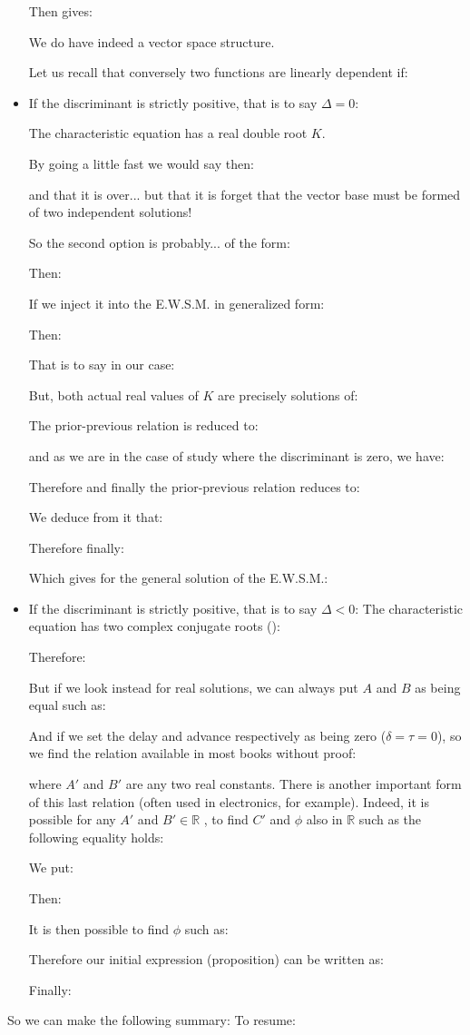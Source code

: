 \begin{itemize}
		Then gives:
		
		We do have indeed a vector space structure.
		
		Let us recall that conversely two functions are linearly dependent if:
		
		\item If the discriminant is strictly positive, that is to say $\Delta=0$: 
		
		The characteristic equation has a real double root $K$.
		
		By going a little fast we would say then:
		
		and that it is over... but that it is forget that the vector base must be formed of two independent solutions!
		
		So the second option is probably... of the form:
		
		Then:
		
		If we inject it into the E.W.S.M. in generalized form:
		
		Then:
		
		That is to say in our case:
		
		But, both actual real values of $K$ are precisely solutions of:
		
		The prior-previous relation is reduced to:
		
		and as we are in the case of study where the discriminant is zero, we have:
		
		Therefore and finally the prior-previous relation reduces to:
		
		We deduce from it that:
		
		Therefore finally:
		
		Which gives for the general solution of the E.W.S.M.:
		
		
		\item If the discriminant is strictly positive, that is to say $\Delta<0$:
		The characteristic equation has two complex conjugate roots ():
		
		Therefore:
		
		But if we look instead for real solutions, we can always put $A$ and $B$ as being equal such as:
		
		And if we set the delay and advance respectively as being zero ($\delta=\tau=0$), so we find the relation available in most books without proof:
		
		where $A'$ and $B'$ are any two real constants. There is another important form of this last relation (often used in electronics, for example). Indeed, it is possible for any $A'$ and $B' \in \mathbb{R}$ , to find $C'$ and $\phi$ also in $\mathbb{R}$ such as the following equality holds:
		
		We put:
		
		Then:
		
		It is then possible to find $\phi$ such as:
		
		Therefore our initial expression (proposition) can be written as:
		
		Finally:
		
	\end{itemize}
	So we can make the following summary:
	To resume:
	

